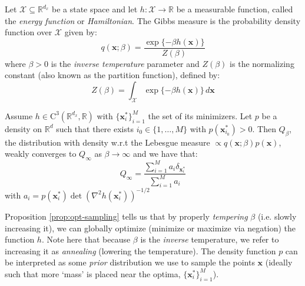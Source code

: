 \begin{definition}
    Let $\mathcal{X} \subseteq \mathbb{R}^{d_x}$ be a state space and let
    $h: \mathcal{X} \rightarrow \mathbb{R}$ be a measurable function, called the
    \emph{energy function} or \emph{Hamiltonian}. The Gibbs measure is the probability density
    function over $\mathcal{X}$ given by:
    \begin{equation}
        q(\mathbf{x}; \beta) = \frac{\exp\{-\beta h(\mathbf{x})\}}{Z(\beta)} \label{eq:gibbs-measure}
    \end{equation}
    where $\beta > 0$ is the \emph{inverse temperature} parameter and $Z(\beta)$ is the normalizing
    constant (also known as the partition function), defined by:
    \begin{equation*}
        Z(\beta) = \int_{\mathcal{X}} \exp\{-\beta h(\mathbf{x})\} \, d\mathbf{x}
    \end{equation*}
\end{definition}

\begin{proposition} \label{prop:opt-sampling}
    Assume $h \in \mathrm{C}^3(\mathbb{R}^{d_x}, \mathbb{R})$ with $\{\mathbf{x}_i^*\}_{i=1}^M$ the
    set of its minimizers. Let $p$ be a density on $\mathbb{R}^d$ such that there exists
    $i_0 \in \{1, \dots, M\}$ with $p(\mathbf{x}_{i_0}^*) > 0$. Then $Q_\beta$, the distribution
    with density w.r.t the Lebesgue measure $\propto q(\mathbf{x}; \beta)p(\mathbf{x})$, weakly
    converges to $Q_{\infty}$ as $\beta \rightarrow \infty$ and we have that:
    \begin{equation}
        Q_\infty = \frac{\sum_{i=1}^{M}a_i\delta_{\mathbf{x}_i^*}}{\sum_{i=1}^{M}a_i} \label{eq:opt-target-inf}
    \end{equation}
    with $a_i = p(\mathbf{x}_i^*)\det(\nabla^2h(\mathbf{x}_i^*))^{-1/2}$
\end{proposition}

\begin{remark}[Annealing]
    Proposition \ref{prop:opt-sampling} tells us that by properly \emph{tempering}
    $\beta$ (i.e. slowly increasing it), we can globally optimize (minimize or maximize via
    negation) the function $h$. Note here that because $\beta$ is the \emph{inverse} temperature,
    we refer to increasing it as \emph{annealing} (lowering the temperature). The density function
    $p$ can be interpreted as some \emph{prior} distribution we use to sample the points $\mathbf{x}$
    (ideally such that more `mass' is placed near the optima, $\{\mathbf{x}_i^*\}_{i=1}^M$).
\end{remark}


